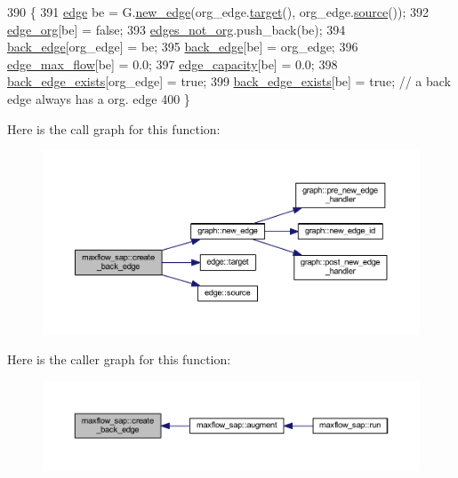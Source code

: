 \begin{DoxyCode}
390 \{
391     \mbox{\hyperlink{classedge}{edge}} be = G.\mbox{\hyperlink{classgraph_a02a0c3a219f75d68caa408ef339d4a1c}{new\_edge}}(org\_edge.\mbox{\hyperlink{classedge_a97563b611261478ee19c6ce055f1a3ee}{target}}(), org\_edge.\mbox{\hyperlink{classedge_ae82d5701f7e6f71edc3c8b0e34bcd2b7}{source}}());
392     \mbox{\hyperlink{classmaxflow__sap_ac445d8c2f7e2080e890a9cdf7413c372}{edge\_org}}[be] = \textcolor{keyword}{false};
393     \mbox{\hyperlink{classmaxflow__sap_ac97c4038560f49eee2e781d12a64fdf5}{edges\_not\_org}}.push\_back(be);
394     \mbox{\hyperlink{classmaxflow__sap_a34793d0909089155a9957deed7c0e1b7}{back\_edge}}[org\_edge] = be;
395     \mbox{\hyperlink{classmaxflow__sap_a34793d0909089155a9957deed7c0e1b7}{back\_edge}}[be] = org\_edge;
396     \mbox{\hyperlink{classmaxflow__sap_a25820db833a98efc69fc3edb79fc49d3}{edge\_max\_flow}}[be] = 0.0;
397     \mbox{\hyperlink{classmaxflow__sap_acfa95eef5ea5bf7814c4dabd3994bc63}{edge\_capacity}}[be] = 0.0;
398     \mbox{\hyperlink{classmaxflow__sap_a13f2b98efc2a4f62fab4ac391ca83a51}{back\_edge\_exists}}[org\_edge] = \textcolor{keyword}{true};
399     \mbox{\hyperlink{classmaxflow__sap_a13f2b98efc2a4f62fab4ac391ca83a51}{back\_edge\_exists}}[be] = \textcolor{keyword}{true};    \textcolor{comment}{// a back edge always has a org. edge}
400 \}
\end{DoxyCode}
Here is the call graph for this function\+:\nopagebreak
\begin{figure}[H]
\begin{center}
\leavevmode
\includegraphics[width=350pt]{classmaxflow__sap_a4278d120bdbc505abb176f5ca6ba02b3_cgraph}
\end{center}
\end{figure}
Here is the caller graph for this function\+:\nopagebreak
\begin{figure}[H]
\begin{center}
\leavevmode
\includegraphics[width=350pt]{classmaxflow__sap_a4278d120bdbc505abb176f5ca6ba02b3_icgraph}
\end{center}
\end{figure}
